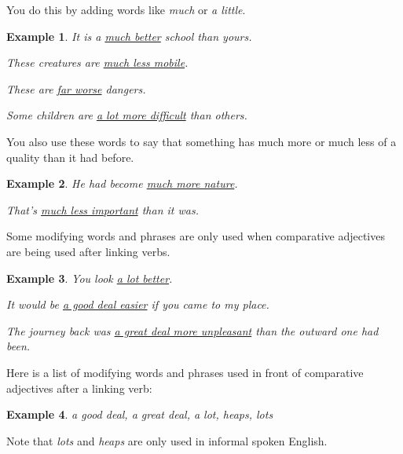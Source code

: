 \documentclass[oneside]{book}
\numberwithin{equation}{section}
\newtheorem{example}{Example}[section]
\begin{document}
You do this by adding words like \textit{much} or \textit{a little}.
\begin{example}
    It is a \underline{much better} school than yours.
    
    These creatures are \underline{much less mobile}.
    
    These are \underline{far worse} dangers.
    
    Some children are \underline{a lot more difficult} than others.
\end{example}
You also use these words to say that something has much more or much less of a quality than it had before.
\begin{example}
    He had become \underline{much more nature}.
    
    That's \underline{much less important} than it was.
\end{example}
%
\noindent{} Some modifying words and phrases are only used when comparative adjectives are being used after linking verbs.
\begin{example}
    You look \underline{a lot better}.
    
    It would be \underline{a good deal easier} if you came to my place.
    
    The journey back was \underline{a great deal more unpleasant} than the outward one had been.
\end{example}
Here is a list of modifying words and phrases used in front of comparative adjectives after a linking verb:
\begin{example}
    a good deal, a great deal, a lot, heaps, lots
\end{example}
Note that \textit{lots} and \textit{heaps} are only used in informal spoken English.
\end{document}
